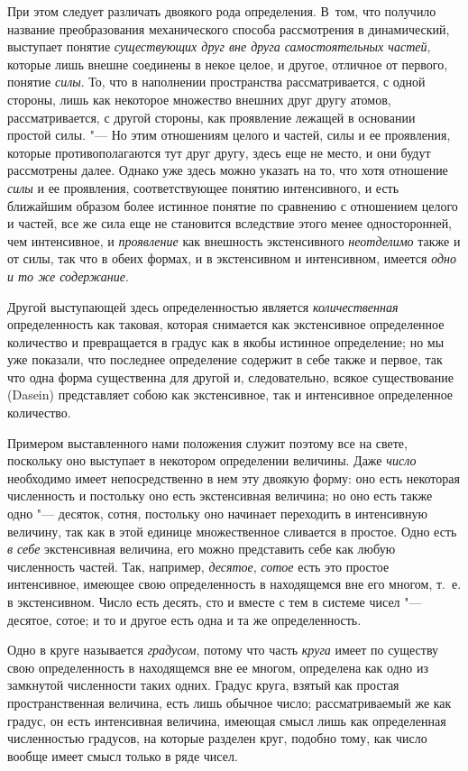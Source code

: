 При этом следует различать двоякого рода определения. В~том, что получило
название преобразования механического способа рассмотрения в динамический,
выступает понятие {\em существующих друг вне друга
самостоятельных частей}, которые лишь внешне соединены в некое целое, и
другое, отличное от первого, понятие {\em силы}. То,
что в наполнении пространства рассматривается, с одной стороны, лишь как
некоторое множество внешних друг другу атомов, рассматривается, с другой
стороны, как проявление лежащей в основании простой силы. "--- Но этим
отношениям целого и частей, силы и ее проявления, которые противополагаются
тут друг другу, здесь еще не место, и они будут рассмотрены далее. Однако
уже здесь можно указать на то, что хотя отношение
{\em силы} и ее проявления, соответствующее понятию
интенсивного, и есть ближайшим образом более истинное понятие по сравнению
с отношением целого и частей, все же сила еще не становится вследствие
этого менее односторонней, чем интенсивное, и
{\em проявление} как внешность экстенсивного
{\em неотделимо} также и от силы, так что в обеих
формах, и в экстенсивном и интенсивном, имеется
{\em одно и то же содержание}.

Другой выступающей здесь определенностью является
{\em количественная} определенность как таковая,
которая снимается как экстенсивное определенное количество и превращается в
градус как в якобы истинное определение; но мы уже показали, что последнее
определение содержит в себе также и первое, так что одна форма существенна
для другой и, следовательно, всякое существование (Dasein) представляет
собою как экстенсивное, так и интенсивное определенное количество.

Примером выставленного нами положения служит поэтому все на свете, поскольку
оно выступает в некотором определении величины. Даже
{\em число} необходимо имеет непосредственно в нем эту
двоякую форму: оно есть некоторая численность и постольку оно есть
экстенсивная величина; но оно есть также одно "--- десяток, сотня, постольку
оно начинает переходить в интенсивную величину, так как в этой единице
множественное сливается в простое. Одно есть {\em в
себе} экстенсивная величина, его можно представить себе как любую
численность частей. Так, например, {\em десятое},
{\em сотое} есть это простое интенсивное, имеющее свою
определенность в находящемся вне его многом, т.~е. в экстенсивном. Число
есть десять, сто и вместе с тем в системе чисел "--- десятое, сотое; и то и
другое есть одна и та же определенность.

Одно в круге называется {\em градусом}, потому что часть
{\em круга} имеет по существу свою определенность в
находящемся вне ее многом, определена как одно из замкнутой численности
таких одних. Градус круга, взятый как простая пространственная величина,
есть лишь обычное число; рассматриваемый же как градус, он есть интенсивная
величина, имеющая смысл лишь как определенная численностью градусов, на
которые разделен круг, подобно тому, как число вообще имеет смысл только в
ряде чисел.


